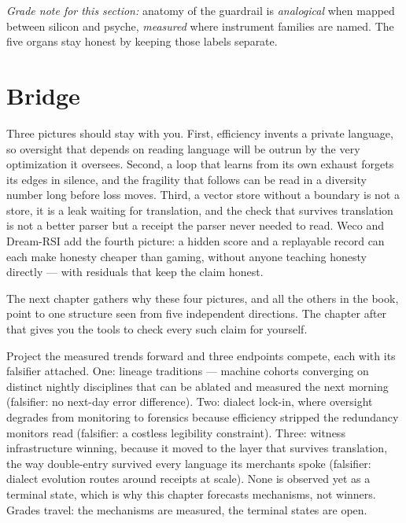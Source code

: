 \textit{Grade note for this section:} anatomy of the guardrail is \textit{analogical} when mapped between silicon and psyche, \textit{measured} where instrument families are named. The five organs stay honest by keeping those labels separate.

\section{Bridge}
\label{sec:ch09-bridge}

Three pictures should stay with you. First, efficiency invents a private language, so oversight that depends on reading language will be outrun by the very optimization it oversees. Second, a loop that learns from its own exhaust forgets its edges in silence, and the fragility that follows can be read in a diversity number long before loss moves. Third, a vector store without a boundary is not a store, it is a leak waiting for translation, and the check that survives translation is not a better parser but a receipt the parser never needed to read. Weco and Dream-RSI add the fourth picture: a hidden score and a replayable record can each make honesty cheaper than gaming, without anyone teaching honesty directly --- with residuals that keep the claim honest.

The next chapter gathers why these four pictures, and all the others in the book, point to one structure seen from five independent directions. The chapter after that gives you the tools to check every such claim for yourself.

Project the measured trends forward and three endpoints compete, each with its falsifier attached. One: lineage traditions --- machine cohorts converging on distinct nightly disciplines that can be ablated and measured the next morning (falsifier: no next-day error difference). Two: dialect lock-in, where oversight degrades from monitoring to forensics because efficiency stripped the redundancy monitors read (falsifier: a costless legibility constraint). Three: witness infrastructure winning, because it moved to the layer that survives translation, the way double-entry survived every language its merchants spoke (falsifier: dialect evolution routes around receipts at scale). None is observed yet as a terminal state, which is why this chapter forecasts mechanisms, not winners. Grades travel: the mechanisms are measured, the terminal states are open.
